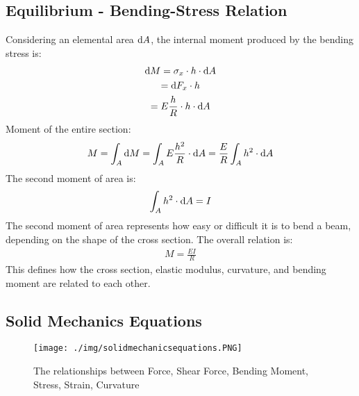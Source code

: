 \subsection{Equilibrium - Bending-Stress Relation}
Considering an elemental area $\dif A$, the internal moment produced by the bending stress is:
\begin{gather}
  \dif M = \sigma_x \cdot h \cdot \dif A \\
  = \dif F_x \cdot h \\
  = E\frac{h}{R} \cdot h \cdot \dif A
\end{gather}
Moment of the entire section:
\begin{gather}
  M = \int_{A}\dif M = \int_{A} E\frac{h^2}{R}\cdot \dif A = \frac{E}{R}\int_{A} h^2\cdot \dif A
\end{gather}
The second moment of area is:
\begin{gather}
  \int_{A} h^2\cdot \dif A = I
\end{gather}
The second moment of area represents how easy or difficult it is to bend a beam, depending on the shape of the cross section. The overall relation is:
\begin{gather}
  M = \frac{EI}{R}
\end{gather}
This defines how the cross section, elastic modulus, curvature, and bending moment are related to each other.
\subsection{Solid Mechanics Equations}
\begin{figure}[H]
  \centering
  \texttt{[image: ./img/solidmechanicsequations.PNG]}
  \caption{The relationships between Force, Shear Force, Bending Moment, Stress, Strain, Curvature}
\end{figure}
